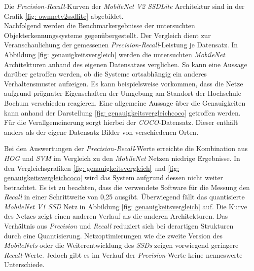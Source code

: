  

 
  
Die \textit{Precision-Recall}-Kurven der \textit{MobileNet V2 SSDLite} Architektur sind in der Grafik \ref{fig: ownnetv2ssdlite} abgebildet. \\

Nachfolgend werden die Benchmarkergebnisse der untersuchten Objekterkennungssysteme gegenübergestellt. Der Vergleich dient zur Veranschaulichung der gemessenen \textit{Precision-Recall}-Leistung je Datensatz. In Abbildung \ref{fig: genauigkeitsvergleich} werden die untersuchten \textit{MobileNet} Architekturen anhand des eigenen Datensatzes verglichen. So kann eine Aussage darüber getroffen werden, ob die Systeme ortsabhängig ein anderes Verhaltensmuster aufzeigen. Es kann beispielsweise vorkommen, dass die Netze aufgrund prägnater Eigenschaften der Umgebung am Standort der Hochschule Bochum verschieden reagieren. Eine allgemeine Aussage über die Genauigkeiten kann anhand der Darstellung \ref{fig: genauigkeitsvergleichcoco} getroffen werden. Für die Verallgemeinerung sorgt hierbei der \textit{COCO}-Datensatz. Dieser enthält anders als der eigene Datensatz Bilder von verschiedenen Orten.     






Bei den Auswertungen der \textit{Precision-Recall}-Werte erreichte die Kombination aus \textit{HOG} und \textit{SVM} im Vergleich zu den \textit{MobileNet} Netzen niedrige Ergebnisse. In den Vergleichsgrafiken \ref{fig: genauigkeitsvergleich} und \ref{fig: genauigkeitsvergleichcoco} wird das System aufgrund dessen nicht weiter betrachtet. Es ist zu beachten, dass die verwendete Software für die Messung den \textit{Recall} in einer Schrittweite von 0,25 ausgibt. Überwiegend fällt das quantisierte \textit{MobileNet V1 SSD} Netz in Abbildung \ref{fig: genauigkeitsvergleich} auf. Die Kurve des Netzes zeigt einen anderen Verlauf als die anderen Architekturen. Das Verhältnis aus \textit{Precision} und \textit{Recall} reduziert sich bei derartigen Strukturen durch eine Quantisierung. Netzoptimierungen wie die zweite Version des \textit{MobileNets} oder die Weiterentwicklung des \textit{SSDs} zeigen vorwiegend geringere \textit{Recall}-Werte. Jedoch gibt es im Verlauf der \textit{Precision}-Werte keine nenneswerte Unterschiede. 








